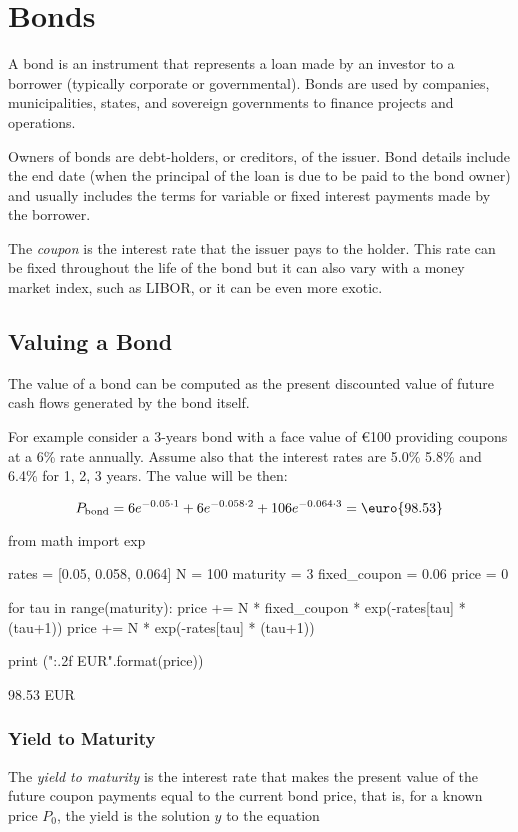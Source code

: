 \chapter{Bonds}
\label{bonds}

A bond is an instrument that represents a loan made by an investor to a borrower (typically corporate or governmental). Bonds are used by companies, municipalities, states, and sovereign governments to finance projects and operations. 

Owners of bonds are debt-holders, or creditors, of the issuer. Bond details include the end date (when the principal of the loan is due to be paid to the bond owner) and usually includes the terms for variable or fixed interest payments made by the borrower.

The \emph{coupon} is the interest rate that the issuer pays to the holder. This rate can be fixed throughout the life of the bond but it can also vary with a money market index, such as LIBOR, or it can be even more exotic.

\section{Valuing a Bond}
\label{sec:bond_pricing}

The value of a bond can be computed as the present discounted value of future cash flows generated by the bond itself.

For example consider a 3-years bond with a face value of \euro{100} providing coupons at a 6\% rate annually. Assume also that the interest rates are 5.0\% 5.8\% and 6.4\% for 1, 2, 3 years. The value will be then:

\[P_{\mathrm{bond}}=6e^{-0.05\cdot 1}+6e^{-0.058\cdot 2}+106e^{-0.064\cdot 3} = \textrm{\euro{98.53}}\]

\begin{ipython}
from math import exp

rates = [0.05, 0.058, 0.064]
N = 100
maturity = 3
fixed_coupon = 0.06
price = 0

for tau in range(maturity):
    price += N * fixed_coupon * exp(-rates[tau] * (tau+1))
price += N * exp(-rates[tau] * (tau+1))

print ("{:.2f} EUR".format(price))
\end{ipython}
\begin{ioutput}
98.53 EUR
\end{ioutput}

\subsection{Yield to Maturity}
The \emph{yield to maturity} is the interest rate that makes the present value of the future coupon payments equal to the current bond price, that is, for a known price $P_0$, the yield is the solution $y$ to the equation

